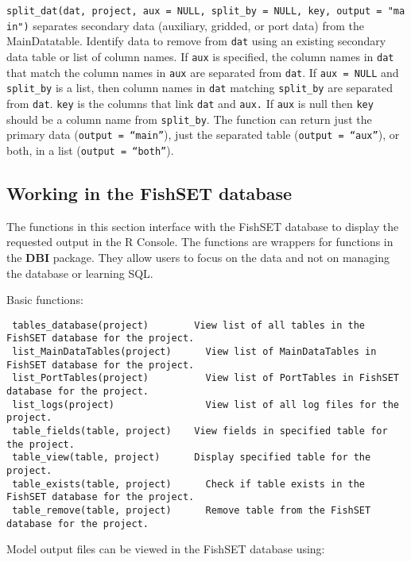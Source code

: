 \documentclass[
]{article}
\begin{document}
\texttt{split\_dat(dat,\ project,\ aux\ =\ NULL,\ split\_by\ =\ NULL,\ key,\ output\ =\ "main")} separates secondary data (auxiliary, gridded, or port data) from the MainDatatable. Identify data to remove from \texttt{dat} using an existing secondary data table or list of column names. If \texttt{aux} is specified, the column names in \texttt{dat} that match the column names in \texttt{aux} are separated from \texttt{dat}. If \texttt{aux\ =\ NULL} and \texttt{split\_by} is a list, then column names in \texttt{dat} matching \texttt{split\_by} are separated from \texttt{dat}. \texttt{key} is the columns that link \texttt{dat} and \texttt{aux.} If \texttt{aux} is null then \texttt{key} should be a column name from \texttt{split\_by}. The function can return just the primary data (\texttt{output\ =\ “main”}), just the separated table (\texttt{output\ =\ “aux”}), or both, in a list (\texttt{output\ =\ “both”}).

\hypertarget{working-in-the-fishset-database}{%
\subsection{Working in the FishSET database}\label{working-in-the-fishset-database}}

The functions in this section interface with the FishSET database to display the requested output in the R Console. The functions are wrappers for functions in the \textbf{DBI} package. They allow users to focus on the data and not on managing the database or learning SQL.

Basic functions:

\begin{verbatim}
 tables_database(project)        View list of all tables in the FishSET database for the project.
 list_MainDataTables(project)      View list of MainDataTables in FishSET database for the project.
 list_PortTables(project)          View list of PortTables in FishSET database for the project.
 list_logs(project)                View list of all log files for the project.
 table_fields(table, project)    View fields in specified table for the project.
 table_view(table, project)      Display specified table for the project.
 table_exists(table, project)      Check if table exists in the FishSET database for the project.
 table_remove(table, project)      Remove table from the FishSET database for the project.
\end{verbatim}

Model output files can be viewed in the FishSET database using:
\end{document}
